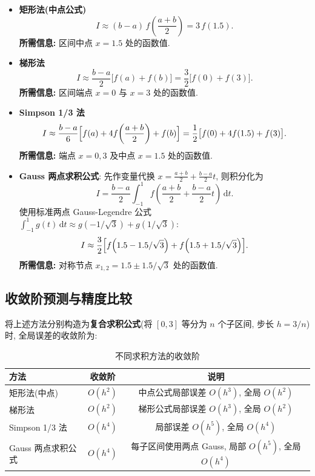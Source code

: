 \documentclass[12pt,a4paper]{ctexart}
\begin{document}
\begin{itemize}
    \item \textbf{矩形法(中点公式)}
    \[
    I \approx (b-a)\,f\!\left(\frac{a+b}{2}\right) = 3\,f(1.5).
    \]
    \textbf{所需信息: } 区间中点 $x=1.5$ 处的函数值. 

    \item \textbf{梯形法}
    \[
    I \approx \frac{b-a}{2}\bigl[f(a)+f(b)\bigr] = \frac{3}{2}\bigl[f(0)+f(3)\bigr].
    \]
    \textbf{所需信息: } 区间端点 $x=0$ 与 $x=3$ 处的函数值. 

    \item \textbf{Simpson 1/3 法}
    \[
    I \approx \frac{b-a}{6}\Bigl[f(a)+4f\!\left(\frac{a+b}{2}\right)+f(b)\Bigr] = \frac{1}{2}\bigl[f(0)+4f(1.5)+f(3)\bigr].
    \]
    \textbf{所需信息: } 端点 $x=0,3$ 及中点 $x=1.5$ 处的函数值. 

    \item \textbf{Gauss 两点求积公式}: 先作变量代换 $x = \frac{a+b}{2} + \frac{b-a}{2}t$, 则积分化为
    \[
    I = \frac{b-a}{2}\int_{-1}^1 f\!\left(\frac{a+b}{2}+\frac{b-a}{2}t\right)\,\mathrm{d}t.
    \]
    使用标准两点 Gauss-Legendre 公式 $\int_{-1}^1 g(t)\,\mathrm{d}t \approx g(-1/\sqrt{3}) + g(1/\sqrt{3})$: 
    \[
    I \approx \frac{3}{2}\Bigl[f\!\left(1.5 - 1.5/\sqrt{3}\right) + f\!\left(1.5 + 1.5/\sqrt{3}\right)\Bigr].
    \]
    \textbf{所需信息: } 对称节点 $x_{1,2} = 1.5 \pm 1.5/\sqrt{3}$ 处的函数值. 
\end{itemize}

\subsection*{收敛阶预测与精度比较}
将上述方法分别构造为\textbf{复合求积公式}(将 $[0,3]$ 等分为 $n$ 个子区间, 步长 $h = 3/n$)时, 全局误差的收敛阶为: 

\begin{table}[H]
\centering
\caption{不同求积方法的收敛阶}
    \begin{tabular}{lcc}
    \toprule
        方法               & 收敛阶   & 说明                                  \\
        \midrule
        矩形法(中点)     & $O(h^2)$ & 中点公式局部误差 $O(h^3)$, 全局 $O(h^2)$ \\
        梯形法             & $O(h^2)$ & 梯形公式局部误差 $O(h^3)$, 全局 $O(h^2)$ \\
        Simpson 1/3 法     & $O(h^4)$ & 局部误差 $O(h^5)$, 全局 $O(h^4)$       \\
        Gauss 两点求积公式 & $O(h^4)$ & 每子区间使用两点 Gauss, 局部 $O(h^5)$, 全局 $O(h^4)$ \\
        \bottomrule
    \end{tabular}
\end{table}
\end{document}
